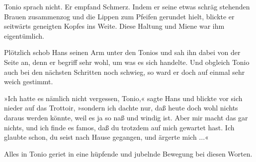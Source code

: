 \documentclass[a5paper,ngerman,11pt]{article}
\begin{document}
Tonio sprach nicht. Er empfand Schmerz. Indem er seine etwas schräg
stehenden Brauen zusammenzog und die Lippen zum Pfeifen gerundet hielt,
blickte er seitwärts geneigten Kopfes ins Weite. Diese Haltung und Miene
war ihm eigentümlich.

Plötzlich schob Hans seinen Arm unter den Tonios und sah ihn dabei von
der Seite an, denn er begriff sehr wohl, um was es sich handelte. Und
obgleich Tonio auch bei den nächsten Schritten noch schwieg, so ward er
doch auf einmal sehr weich gestimmt.

»Ich hatte es nämlich nicht vergessen, Tonio,« sagte Hans und blickte
vor sich nieder auf das Trottoir, »sondern ich dachte nur, daß heute
doch wohl nichts daraus werden könnte, weil es ja so naß und windig ist.
Aber mir macht das gar nichts, und ich finde es famos, daß du trotzdem
auf mich gewartet hast. Ich glaubte schon, du seist nach Hause gegangen,
und ärgerte mich ...«

Alles in Tonio geriet in eine hüpfende und jubelnde Bewegung bei diesen
Worten.
\end{document}
